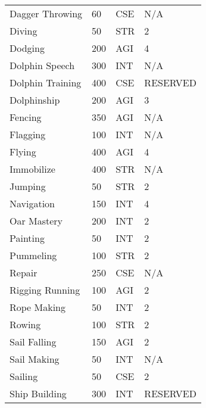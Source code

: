 \begin{normbox}
\begin{tabularx}{\linewidth}{@{} l X X X }
Dagger Throwing & 60 & CSE & N/A \\
Diving & 50 & STR & 2 \\
Dodging & 200 & AGI & 4 \\
Dolphin Speech & 300 & INT & N/A \\
Dolphin Training & 400 & CSE & RESERVED \\
Dolphinship & 200 & AGI & 3 \\
Fencing & 350 & AGI & N/A \\
Flagging & 100 & INT & N/A \\
Flying & 400 & AGI & 4 \\
Immobilize & 400 & STR & N/A \\
Jumping & 50 & STR & 2 \\
Navigation & 150 & INT & 4 \\
Oar Mastery & 200 & INT & 2 \\
Painting & 50 & INT & 2 \\
Pummeling & 100 & STR & 2 \\
Repair & 250 & CSE & N/A \\
Rigging Running & 100 & AGI & 2 \\
Rope Making & 50 & INT & 2 \\
Rowing & 100 & STR & 2 \\
Sail Falling & 150 & AGI & 2 \\
Sail Making & 50 & INT & N/A \\
Sailing & 50 & CSE & 2 \\
Ship Building & 300 & INT & RESERVED \\
\end{tabularx}
\end{normbox}
